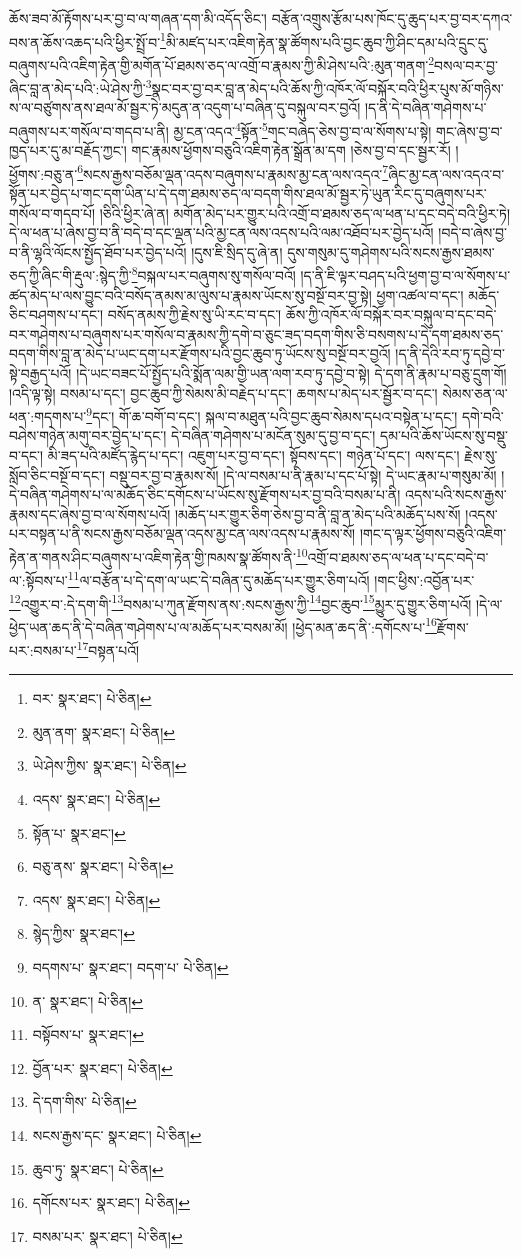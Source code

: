 ཆོས་ཟབ་མོ་རྟོགས་པར་བྱ་བ་ལ་གཞན་དག་མི་འདོད་ཅིང་། བརྩོན་འགྲུས་རྩོམ་པས་ཁོང་དུ་ཆུད་པར་བྱ་བར་དཀའ་བས་ན་ཆོས་འཆད་པའི་ཕྱིར་སྤྲོ་བ་\footnote{བར་  སྣར་ཐང་།  པེ་ཅིན། }མི་མཛད་པར་འཇིག་རྟེན་སྣ་ཚོགས་པའི་བྱང་ཆུབ་ཀྱི་ཤིང་དམ་པའི་དྲུང་དུ་བཞུགས་པའི་འཇིག་རྟེན་གྱི་མགོན་པོ་ཐམས་ཅད་ལ་འགྲོ་བ་རྣམས་ཀྱི་མི་ཤེས་པའི་:མུན་གནག་\footnote{མུན་ནག་  སྣར་ཐང་།  པེ་ཅིན། }བསལ་བར་བྱ་ཞིང་བླ་ན་མེད་པའི་:ཡེ་ཤེས་ཀྱི་\footnote{ཡེ་ཤེས་ཀྱིས་  སྣར་ཐང་།  པེ་ཅིན། }སྣང་བར་བྱ་བར་བླ་ན་མེད་པའི་ཆོས་ཀྱི་འཁོར་ལོ་བསྐོར་བའི་ཕྱིར་པུས་མོ་གཉིས་ས་ལ་བཙུགས་ནས་ཐལ་མོ་སྦྱར་ཏེ་མདུན་ན་འདུག་པ་བཞིན་དུ་བསྐུལ་བར་བྱའོ། །ད་ནི་དེ་བཞིན་གཤེགས་པ་བཞུགས་པར་གསོལ་བ་གདབ་པ་ནི། མྱ་ངན་འདའ་\footnote{འདས་  སྣར་ཐང་།  པེ་ཅིན། }སྟོན་\footnote{སྟོན་པ་  སྣར་ཐང་། }གང་བཞེད་ཅེས་བྱ་བ་ལ་སོགས་པ་སྟེ། གང་ཞེས་བྱ་བ་ཁྱད་པར་དུ་མ་བརྗོད་ཀྱང་། གང་རྣམས་ཕྱོགས་བཅུའི་འཇིག་རྟེན་སྒྲོན་མ་དག །ཅེས་བྱ་བ་དང་སྦྱར་རོ། །ཕྱོགས་:བཅུ་ན་\footnote{བཅུ་ནས་  སྣར་ཐང་།  པེ་ཅིན། }སངས་རྒྱས་བཅོམ་ལྡན་འདས་བཞུགས་པ་རྣམས་མྱ་ངན་ལས་འདའ་\footnote{འདས་  སྣར་ཐང་།  པེ་ཅིན། }ཞིང་མྱ་ངན་ལས་འདའ་བ་སྟོན་པར་བྱེད་པ་གང་དག་ཡིན་པ་དེ་དག་ཐམས་ཅད་ལ་བདག་གིས་ཐལ་མོ་སྦྱར་ཏེ་ཡུན་རིང་དུ་བཞུགས་པར་གསོལ་བ་གདབ་པོ། །ཅིའི་ཕྱིར་ཞེ་ན། མགོན་མེད་པར་གྱུར་པའི་འགྲོ་བ་ཐམས་ཅད་ལ་ཕན་པ་དང་བདེ་བའི་ཕྱིར་ཏེ། དེ་ལ་ཕན་པ་ཞེས་བྱ་བ་ནི་བདེ་བ་དང་ལྡན་པའི་མྱ་ངན་ལས་འདས་པའི་ལམ་འཐོབ་པར་བྱེད་པའོ། །བདེ་བ་ཞེས་བྱ་བ་ནི་ལྷའི་ལོངས་སྤྱོད་ཐོབ་པར་བྱེད་པའོ། །དུས་ཇི་སྲིད་དུ་ཞེ་ན། དུས་གསུམ་དུ་གཤེགས་པའི་སངས་རྒྱས་ཐམས་ཅད་ཀྱི་ཞིང་གི་རྡུལ་:སྙེད་ཀྱི་\footnote{སྙེད་ཀྱིས་  སྣར་ཐང་། }བསྐལ་པར་བཞུགས་སུ་གསོལ་བའོ། །ད་ནི་ཇི་ལྟར་བཤད་པའི་ཕྱག་བྱ་བ་ལ་སོགས་པ་ཚད་མེད་པ་ལས་བྱུང་བའི་བསོད་ནམས་མ་ལུས་པ་རྣམས་ཡོངས་སུ་བསྔོ་བར་བྱ་སྟེ། ཕྱག་འཚལ་བ་དང་། མཆོད་ཅིང་བཤགས་པ་དང་། བསོད་ནམས་ཀྱི་རྗེས་སུ་ཡི་རང་བ་དང་། ཆོས་ཀྱི་འཁོར་ལོ་བསྐོར་བར་བསྐུལ་བ་དང་བདེ་བར་གཤེགས་པ་བཞུགས་པར་གསོལ་བ་རྣམས་ཀྱི་དགེ་བ་ཅུང་ཟད་བདག་གིས་ཅི་བསགས་པ་དེ་དག་ཐམས་ཅད་བདག་གིས་བླ་ན་མེད་པ་ཡང་དག་པར་རྫོགས་པའི་བྱང་ཆུབ་ཏུ་ཡོངས་སུ་བསྔོ་བར་བྱའོ། །ད་ནི་དེའི་རབ་ཏུ་དབྱེ་བ་སྟེ་བརྒྱད་པའོ། །དེ་ཡང་བཟང་པོ་སྤྱོད་པའི་སྨོན་ལམ་གྱི་ཡན་ལག་རབ་ཏུ་དབྱེ་བ་སྟེ། དེ་དག་ནི་རྣམ་པ་བཅུ་དྲུག་གོ། །འདི་ལྟ་སྟེ། བསམ་པ་དང་། བྱང་ཆུབ་ཀྱི་སེམས་མི་བརྗེད་པ་དང་། ཆགས་པ་མེད་པར་སྦྱོར་བ་དང་། སེམས་ཅན་ལ་ཕན་:གདགས་པ་\footnote{བདགས་པ་  སྣར་ཐང་། བདག་པ་  པེ་ཅིན། }དང་། གོ་ཆ་བགོ་བ་དང་། སྐལ་བ་མཐུན་པའི་བྱང་ཆུབ་སེམས་དཔའ་བསྟེན་པ་དང་། དགེ་བའི་བཤེས་གཉེན་མགུ་བར་བྱེད་པ་དང་། དེ་བཞིན་གཤེགས་པ་མངོན་སུམ་དུ་བྱ་བ་དང་། དམ་པའི་ཆོས་ཡོངས་སུ་བསྡུ་བ་དང་། མི་ཟད་པའི་མཛོད་རྙེད་པ་དང་། འཇུག་པར་བྱ་བ་དང་། སྟོབས་དང་། གཉེན་པོ་དང་། ལས་དང་། རྗེས་སུ་སློབ་ཅིང་བསྔོ་བ་དང་། བསྡུ་བར་བྱ་བ་རྣམས་སོ། །དེ་ལ་བསམ་པ་ནི་རྣམ་པ་དང་པོ་སྟེ། དེ་ཡང་རྣམ་པ་གསུམ་མོ། །དེ་བཞིན་གཤེགས་པ་ལ་མཆོད་ཅིང་དགོངས་པ་ཡོངས་སུ་རྫོགས་པར་བྱ་བའི་བསམ་པ་ནི། འདས་པའི་སངས་རྒྱས་རྣམས་དང་ཞེས་བྱ་བ་ལ་སོགས་པའོ། །མཆོད་པར་གྱུར་ཅིག་ཅེས་བྱ་བ་ནི་བླ་ན་མེད་པའི་མཆོད་པས་སོ། །འདས་པར་བསྟན་པ་ནི་སངས་རྒྱས་བཅོམ་ལྡན་འདས་མྱ་ངན་ལས་འདས་པ་རྣམས་སོ། །གང་ད་ལྟར་ཕྱོགས་བཅུའི་འཇིག་རྟེན་ན་གནས་ཤིང་བཞུགས་པ་འཇིག་རྟེན་གྱི་ཁམས་སྣ་ཚོགས་ནི་\footnote{ན་  སྣར་ཐང་།  པེ་ཅིན། }འགྲོ་བ་ཐམས་ཅད་ལ་ཕན་པ་དང་བདེ་བ་ལ་:སྟོབས་པ་\footnote{བསྟོབས་པ་  སྣར་ཐང་། }ལ་བརྩོན་པ་དེ་དག་ལ་ཡང་དེ་བཞིན་དུ་མཆོད་པར་གྱུར་ཅིག་པའོ། །གང་ཕྱིས་:འབྱོན་པར་\footnote{བྱོན་པར་  སྣར་ཐང་།  པེ་ཅིན། }འགྱུར་བ་:དེ་དག་གི་\footnote{དེ་དག་གིས་  པེ་ཅིན། }བསམ་པ་ཀུན་རྫོགས་ནས་:སངས་རྒྱས་ཀྱི་\footnote{སངས་རྒྱས་དང་  སྣར་ཐང་།  པེ་ཅིན། }བྱང་ཆུབ་\footnote{ཆུབ་ཏུ་  སྣར་ཐང་།  པེ་ཅིན། }མྱུར་དུ་གྱུར་ཅིག་པའོ། །དེ་ལ་ཕྱེད་ཡན་ཆད་ནི་དེ་བཞིན་གཤེགས་པ་ལ་མཆོད་པར་བསམ་མོ། །ཕྱེད་མན་ཆད་ནི་:དགོངས་པ་\footnote{དགོངས་པར་  སྣར་ཐང་།  པེ་ཅིན། }རྫོགས་པར་:བསམ་པ་\footnote{བསམ་པར་  སྣར་ཐང་།  པེ་ཅིན། }བསྟན་པའོ། 